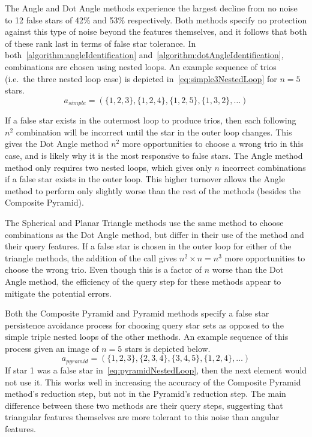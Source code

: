 The Angle and Dot Angle methods experience the largest decline from no noise to 12 false stars of 42\% and 53\%
respectively.
Both methods specify no protection against this type of noise beyond the features themselves, and it follows that
both of these rank last in terms of false star tolerance.
In both~\autoref{algorithm:angleIdentification} and~\autoref{algorithm:dotAngleIdentification}, combinations are chosen
using nested loops.
An example sequence of trios (i.e.\ the three nested loop case) is depicted in~\autoref{eq:simple3NestedLoop} for
$n = 5$ stars.
\begin{equation}\label{eq:simple3NestedLoop}
a_{simple} = ( \{1,2,3\}, \{1,2,4\}, \{1,2,5\}, \{1,3,2\}, \ldots )
\end{equation}

If a false star exists in the outermost loop to produce trios, then each following $n^2$ combination will be incorrect
until the star in the outer loop changes.
This gives the Dot Angle method $n^2$ more opportunities to choose a wrong trio in this case, and is likely why it is
the most responsive to false stars.
The Angle method method only requires two nested loops, which gives only $n$ incorrect combinations if a false star
exists in the outer loop.
This higher turnover allows the Angle method to perform only slightly worse than the rest of the methods (besides
the Composite Pyramid).

The Spherical and Planar Triangle methods use the same method to choose combinations as the Dot Angle method, but differ
in their use of the  method and their query features.
If a false star is chosen in the outer loop for either of the triangle methods, the addition of the  call
gives $n^2 \times n = n^3$ more opportunities to choose the wrong trio.
Even though this is a factor of $n$ worse than the Dot Angle method, the efficiency of the query step for these
methods appear to mitigate the potential errors.

Both the Composite Pyramid and Pyramid methods specify a false star persistence avoidance process for choosing
query star sets as opposed to the simple triple nested loops of the other methods.
An example sequence of this process given an image of $n=5$ stars is depicted below.
\begin{equation}\label{eq:pyramidNestedLoop}
a_{pyramid} = ( \{1,2,3\}, \{2,3,4\}, \{3,4,5\}, \{1,2,4\}, \ldots)
\end{equation}
If star 1 was a false star in~\autoref{eq:pyramidNestedLoop}, then the next element would not use it.
This works well in increasing the accuracy of the Composite Pyramid method's reduction step, but not in the Pyramid's
reduction step.
The main difference between these two methods are their query steps, suggesting that triangular features themselves
are more tolerant to this noise than angular features.

